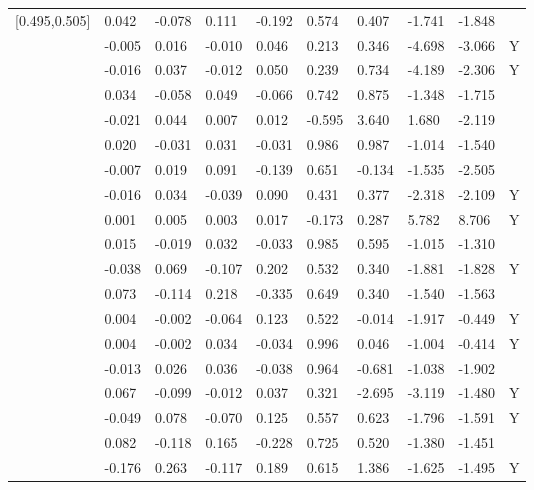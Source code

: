 \begin{table}[ht]
\begin{tabular}{llllllllll}
  [0.495,0.505] &  0.042 & -0.078 &  0.111 & -0.192 &   0.574 &   0.407 &  -1.741 &  -1.848 &  \\ 
  [0.505,0.515] & -0.005 &  0.016 & -0.010 &  0.046 &   0.213 &   0.346 &  -4.698 &  -3.066 & Y \\ 
  [0.515,0.525] & -0.016 &  0.037 & -0.012 &  0.050 &   0.239 &   0.734 &  -4.189 &  -2.306 & Y \\ 
  [0.525,0.535] &  0.034 & -0.058 &  0.049 & -0.066 &   0.742 &   0.875 &  -1.348 &  -1.715 &  \\ 
  [0.535,0.545] & -0.021 &  0.044 &  0.007 &  0.012 &  -0.595 &   3.640 &   1.680 &  -2.119 &  \\ 
  [0.545,0.555] &  0.020 & -0.031 &  0.031 & -0.031 &   0.986 &   0.987 &  -1.014 &  -1.540 &  \\ 
  [0.555,0.565] & -0.007 &  0.019 &  0.091 & -0.139 &   0.651 &  -0.134 &  -1.535 &  -2.505 &  \\ 
  [0.565,0.575] & -0.016 &  0.034 & -0.039 &  0.090 &   0.431 &   0.377 &  -2.318 &  -2.109 & Y \\ 
  [0.575,0.585] &  0.001 &  0.005 &  0.003 &  0.017 &  -0.173 &   0.287 &   5.782 &   8.706 & Y \\ 
  [0.585,0.595] &  0.015 & -0.019 &  0.032 & -0.033 &   0.985 &   0.595 &  -1.015 &  -1.310 &  \\ 
  [0.595,0.605] & -0.038 &  0.069 & -0.107 &  0.202 &   0.532 &   0.340 &  -1.881 &  -1.828 & Y \\ 
  [0.605,0.615] &  0.073 & -0.114 &  0.218 & -0.335 &   0.649 &   0.340 &  -1.540 &  -1.563 &  \\ 
  [0.615,0.625] &  0.004 & -0.002 & -0.064 &  0.123 &   0.522 &  -0.014 &  -1.917 &  -0.449 & Y \\ 
  [0.625,0.635] &  0.004 & -0.002 &  0.034 & -0.034 &   0.996 &   0.046 &  -1.004 &  -0.414 & Y \\ 
  [0.635,0.645] & -0.013 &  0.026 &  0.036 & -0.038 &   0.964 &  -0.681 &  -1.038 &  -1.902 &  \\ 
  [0.645,0.655] &  0.067 & -0.099 & -0.012 &  0.037 &   0.321 &  -2.695 &  -3.119 &  -1.480 & Y \\ 
  [0.655,0.665] & -0.049 &  0.078 & -0.070 &  0.125 &   0.557 &   0.623 &  -1.796 &  -1.591 & Y \\ 
  [0.665,0.675] &  0.082 & -0.118 &  0.165 & -0.228 &   0.725 &   0.520 &  -1.380 &  -1.451 &  \\ 
  [0.675,0.685] & -0.176 &  0.263 & -0.117 &  0.189 &   0.615 &   1.386 &  -1.625 &  -1.495 & Y \\ 

\end{tabular}
\end{table}
